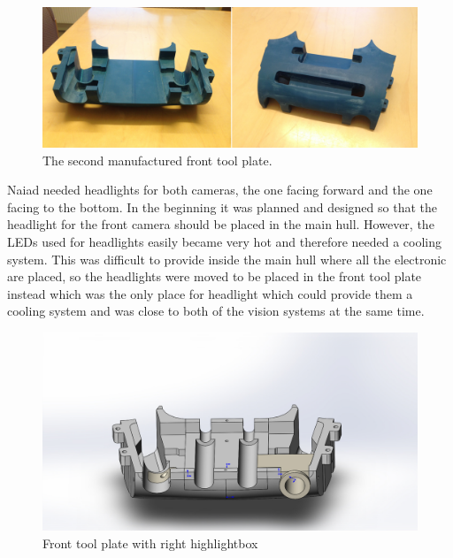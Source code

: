 	\begin{figure}[!ht]
		\begin{center}
			\includegraphics[width=130mm]{./Images/Mechanics/ftpplastic.jpg}
			\caption{The second manufactured front tool plate.}
			\label{plastic}
		\end{center}
	\end{figure}

Naiad needed headlights for both cameras, the one facing forward and the one facing to the bottom. In the beginning it was planned and designed so that the headlight for the front camera should be placed in the main hull. However, the LEDs used for headlights easily became very hot and therefore needed a cooling system. This was difficult to provide inside the main hull where all the electronic are placed, so the headlights were moved to be placed in the front tool plate instead which was the only place for headlight which could provide them a cooling system and was close to both of the vision systems at the same time.

	\begin{figure}[!ht]
		\begin{center}
			\includegraphics[width=120mm]{./Images/Mechanics/FTPv7leds.JPG}
			\caption{Front tool plate with right highlightbox}
			\label{rightlight}
		\end{center}
	\end{figure}


